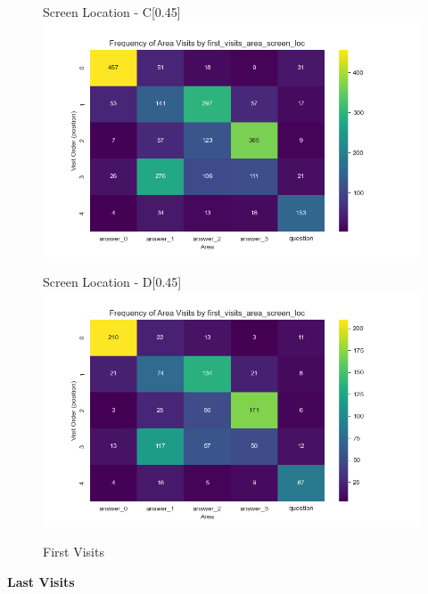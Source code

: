 \documentclass{article}
\begin{document}
\begin{figure}[H]
  \begin{subcaptionbox}{Screen Location - C\label{fig:sl_c}}[0.45\textwidth]
    {\centering\includegraphics[width=\linewidth]{plots/visits/matrix__first_visits_area_screen_loc_hunters_C.png}}
  \end{subcaptionbox}
  \hfill
  \begin{subcaptionbox}{Screen Location - D\label{fig:sl_d}}[0.45\textwidth]
    {\centering\includegraphics[width=\linewidth]{plots/visits/matrix__first_visits_area_screen_loc_hunters_D.png}}
  \end{subcaptionbox}
  
  \caption{First Visits}
  \label{fig:fourimages2}
\end{figure}





\newpage
\textbf{Last Visits}
\end{document}
